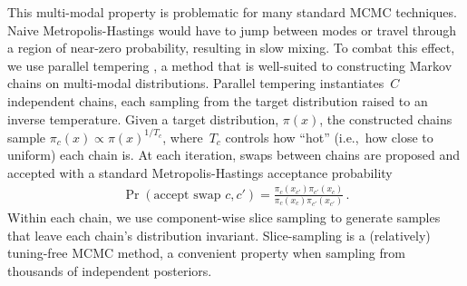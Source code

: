 \documentclass{article} %
\begin{document}
This multi-modal property is problematic for many standard MCMC techniques. 
Naive Metropolis-Hastings would have to jump between modes or travel through a region of near-zero probability, resulting in slow mixing.  
To combat this effect, we use parallel tempering \cite{brooks2011handbook}, a method that is well-suited to constructing Markov chains on multi-modal distributions.
Parallel tempering instantiates~$C$ independent chains, each sampling from the target distribution raised to an inverse temperature.
Given a target distribution, $\pi(x)$, the constructed chains sample 
${\pi_c(x) \propto \pi(x)^{1/T_c}}$,
where~$T_c$ controls how ``hot'' (i.e.,~how close to uniform) each chain is. 
At each iteration, swaps between chains are proposed and accepted with a standard Metropolis-Hastings acceptance probability 
\begin{align}
  \Pr(\text{accept swap } c, c') = \frac{ \pi_c(x_{c'}) \pi_{c'}(x_c) }{ \pi_c(x_c) \pi_{c'}(x_{c'}) } \, .
\end{align}
Within each chain, we use component-wise slice sampling \cite{neal2003slice} to generate samples that leave each chain's distribution invariant.  Slice-sampling is a (relatively) tuning-free MCMC method, a convenient property when sampling from thousands of independent posteriors.  
\end{document}
